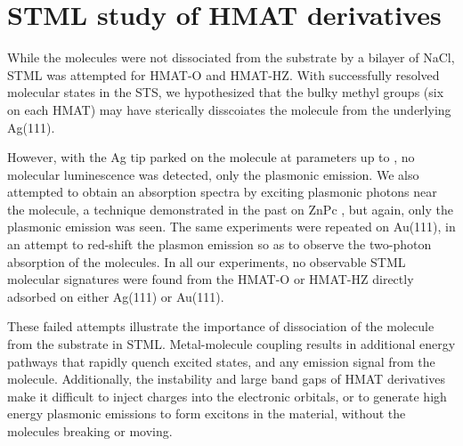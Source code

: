 \section{{STML} study of HMAT derivatives}

While the molecules were not dissociated from the substrate by a bilayer of NaCl, \ac{STML} was attempted for \ac{HMAT-O} and \ac{HMAT-HZ}. With successfully resolved molecular states in the \ac{STS}, we hypothesized that the bulky methyl groups (six on each \ac{HMAT}) may have sterically disscoiates the molecule from the underlying Ag(111).

However, with the Ag tip parked on the molecule at parameters up to , no molecular luminescence was detected, only the plasmonic emission. We also attempted to obtain an absorption spectra by exciting plasmonic photons near the molecule, a technique demonstrated in the past on ZnPc \cite{zhang2017sub}, but again, only the plasmonic emission was seen. The same experiments were repeated on Au(111), in an attempt to red-shift the plasmon emission so as to observe the two-photon absorption of the molecules. In all our experiments, no observable \ac{STML} molecular signatures were found from the HMAT-O or HMAT-HZ directly adsorbed on either Ag(111) or Au(111). 

These failed attempts illustrate the importance of dissociation of the molecule from the substrate in \ac{STML}. Metal-molecule coupling results in additional energy pathways that rapidly quench excited states, and any emission signal from the molecule. Additionally, the instability and large band gaps of \ac{HMAT} derivatives make it difficult to inject charges into the electronic orbitals, or to generate high energy plasmonic emissions to form excitons in the material, without the molecules breaking or moving. 




